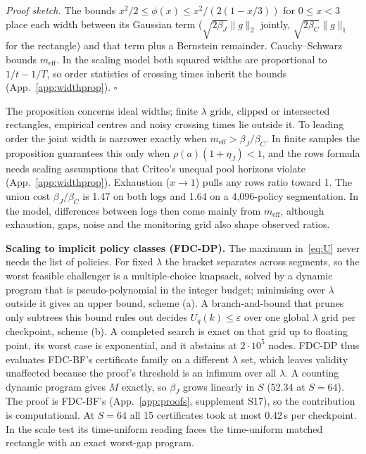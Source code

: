 \documentclass[sigconf,anonymous,review]{acmart}
\newcommand{\eps}{\varepsilon}
\newcommand{\meff}{m_{\text{eff}}}
\begin{document}
\noindent\emph{Proof sketch.} The bounds $x^2/2 \le \phi(x) \le x^2/(2(1-x/3))$ for $0 \le x < 3$ place each width between its Gaussian term ($\sqrt{2\beta_J}\|g\|_2$ jointly, $\sqrt{2\beta_C}\|g\|_1$ for the rectangle) and that term plus a Bernstein remainder. Cauchy--Schwarz bounds $\meff$. In the scaling model both squared widths are proportional to $1/t - 1/T$, so order statistics of crossing times inherit the bounds (App.~\ref{app:widthprop}). $\square$

The proposition concerns ideal widths; finite $\lambda$ grids, clipped or intersected rectangles, empirical centres and noisy crossing times lie outside it. To leading order the joint width is narrower exactly when $\meff > \beta_J/\beta_C$. In finite samples the proposition guarantees this only when $\rho(a)(1+\eta_J) < 1$, and the rows formula needs scaling assumptions that Criteo's unequal pool horizons violate (App.~\ref{app:widthprop}). Exhaustion ($x \to 1$) pulls any rows ratio toward 1. The union cost $\beta_J/\beta_C$ is 1.47 on both logs and 1.64 on a 4,096-policy segmentation. In the model, differences between logs then come mainly from $\meff$, although exhaustion, gaps, noise and the monitoring grid also shape observed ratios.

\textbf{Scaling to implicit policy classes (FDC-DP).} The maximum in~\eqref{eq:U} never needs the list of policies. For fixed $\lambda$ the bracket separates across segments, so the worst feasible challenger is a multiple-choice knapsack, solved by a dynamic program that is pseudo-polynomial in the integer budget; minimising over $\lambda$ outside it gives an upper bound, scheme (a). A branch-and-bound that prunes only subtrees this bound rules out decides $U_q(k) \le \eps$ over one global $\lambda$ grid per checkpoint, scheme (b). A completed search is exact on that grid up to floating point, its worst case is exponential, and it abstains at $2 \cdot 10^5$ nodes. FDC-DP thus evaluates FDC-BF's certificate family on a different $\lambda$ set, which leaves validity unaffected because the proof's threshold is an infimum over all $\lambda$. A counting dynamic program gives $M$ exactly, so $\beta_J$ grows linearly in $S$ (52.34 at $S = 64$). The proof is FDC-BF's (App.~\ref{app:proofs}, supplement S17), so the contribution is computational. At $S = 64$ all 15 certificates took at most 0.42\,s per checkpoint. In the scale test its time-uniform reading faces the time-uniform matched rectangle with an exact worst-gap program.

\end{document}
